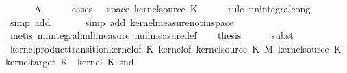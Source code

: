 \begin{isabellebody}
\ \ \ \ \ {\isasymomega}\ A\isanewline
\ \ \ \ \isamarkupfalse%
\ {\isacharparenleft}{\kern0pt}cases\ {\isachardoublequoteopen}{\isasymomega}\ {\isasymin}\ space\ {\isacharparenleft}{\kern0pt}kernel{\isacharunderscore}{\kern0pt}source\ K{\isacharunderscore}{\kern0pt}{}{\isacharparenright}{\kern0pt}{\isachardoublequoteclose}{\isacharparenright}{\kern0pt}\isanewline
\ \ \ \ \isamarkupfalse%
\ {\isacharparenleft}{\kern0pt}rule\ nn{\isacharunderscore}{\kern0pt}integral{\isacharunderscore}{\kern0pt}cong{\isacharparenright}{\kern0pt}\isanewline
\ \ \ \ \ \isamarkupfalse%
\ {\isacharparenleft}{\kern0pt}simp\ add{\isacharcolon}{\kern0pt}\ {}{\isacharparenright}{\kern0pt}\isanewline
\ \ \ \ \isamarkupfalse%
\ {\isacharparenleft}{\kern0pt}simp\ add{\isacharcolon}{\kern0pt}\ kernel{\isacharunderscore}{\kern0pt}measure{\isacharunderscore}{\kern0pt}notin{\isacharunderscore}{\kern0pt}space{\isacharparenright}{\kern0pt}\isanewline
\ \ \ \ \isamarkupfalse%
\ {\isacharparenleft}{\kern0pt}metis\ nn{\isacharunderscore}{\kern0pt}integral{\isacharunderscore}{\kern0pt}null{\isacharunderscore}{\kern0pt}measure\ null{\isacharunderscore}{\kern0pt}measure{\isacharunderscore}{\kern0pt}def{\isacharparenright}{\kern0pt}\isanewline
\ \ \isamarkupfalse%
\ {\isacharquery}{\kern0pt}thesis\isanewline
\ \ \ \ \isamarkupfalse%
\ {\isacharparenleft}{\kern0pt}subst\ {}{\isacharparenright}{\kern0pt}\isanewline
\ \ \ \ \isamarkupfalse%
\ kernel{\isacharunderscore}{\kern0pt}product{\isacharunderscore}{\kern0pt}transition{\isacharunderscore}{\kern0pt}kernel{\isacharbrackleft}{\kern0pt}of\ K{\isacharunderscore}{\kern0pt}{}\ {\isachardoublequoteopen}kernel{\isacharunderscore}{\kern0pt}of\ {\isacharparenleft}{\kern0pt}kernel{\isacharunderscore}{\kern0pt}source\ K{\isacharunderscore}{\kern0pt}{}\ {\isasymOtimes}\isactrlsub M\ kernel{\isacharunderscore}{\kern0pt}source\ K{\isacharunderscore}{\kern0pt}{}{\isacharparenright}{\kern0pt}\ {\isacharparenleft}{\kern0pt}kernel{\isacharunderscore}{\kern0pt}target\ K{\isacharunderscore}{\kern0pt}{}{\isacharparenright}{\kern0pt}\ {\isacharparenleft}{\kern0pt}{\isasymlambda}{\isasymomega}{\isachardot}{\kern0pt}\ kernel\ K{\isacharunderscore}{\kern0pt}{}\ {\isacharparenleft}{\kern0pt}snd\ {\isasymomega}{\isacharparenright}{\kern0pt}{\isacharparenright}{\kern0pt}{\isachardoublequoteclose}{\isacharbrackright}{\kern0pt}\isanewline

\end{isabellebody}
